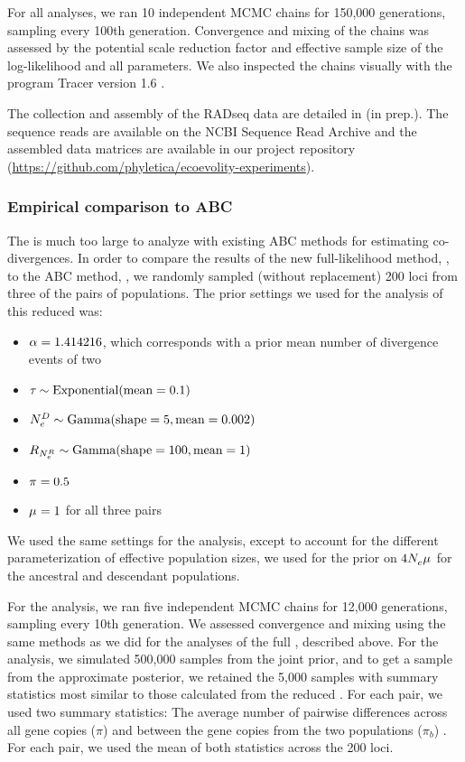 For all analyses, we ran 10 independent MCMC chains for 150,000 generations,
sampling every 100th generation.
Convergence and mixing of the chains was assessed by the potential scale
reduction factor
\citep[PSRF; the square root of Equation 1.1 in][]{Brooks1998}
and effective sample size
\citep[ESS;][]{Gong2014}
of the log-likelihood and all parameters.
We also inspected the chains visually with the program Tracer version 1.6
\citep{Tracer16}.

The collection and assembly of the  RADseq data are detailed in
\citeauthor{Oaks2018paic} (in prep.).
The sequence reads are available on the NCBI Sequence Read Archive
and the assembled data matrices are available in our project repository
(\url{https://github.com/phyletica/ecoevolity-experiments}).

\subsubsection{Empirical comparison to ABC}
The  \dataset is much too large to analyze with existing ABC
methods for estimating co-divergences.
In order to compare the results of the new full-likelihood method, \ecoevolity,
to the ABC method, \dppmsbayes, we randomly sampled (without replacement) 200
loci from three of the pairs of  populations.
The prior settings we used for the \ecoevolity analysis of this reduced
\dataset was:
\begin{itemize}
    \item $\concentration = 1.414216$, which corresponds with a prior mean
        number of divergence events of two
    \item $\divtime \sim \dexponential{0.1}$
    \item $\epopsize[\descendantpopindex{}] \sim \dgamma{5}{0.002}$
    \item $\rootrelativepopsize \sim \dgamma{100}{1}$
    \item $\gfreq = 0.5$
    \item $\murate = 1$ for all three pairs
\end{itemize}
We used the same settings for the \dppmsbayes analysis, except to account for
the different parameterization of effective population sizes, we used
for the prior on
$4\epopsize{}\murate{}$
for the ancestral and descendant populations.

For the \ecoevolity analysis, we ran five independent MCMC chains for 12,000
generations, sampling every 10th generation.
We assessed convergence and mixing using the same methods as we did for the
analyses of the full  \dataset, described above.
For the \dppmsbayes analysis, we simulated 500,000 samples from the joint
prior, and to get a sample from the approximate posterior, we retained the
5,000 samples with summary statistics most similar to those calculated
from the reduced  \dataset.
For each pair, we used two summary statistics:
The average number of pairwise differences across all gene copies ($\pi$) and
between the gene copies from the two populations ($\pi_b$) \citep{NeiLi1979}.
For each pair, we used the mean of both statistics across the 200 loci.


